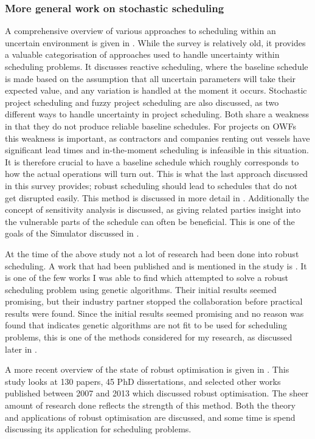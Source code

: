 \documentclass[a4paper,12pt]{article}
\begin{document}

\subsubsection{More general work on stochastic scheduling} \label{sss:stoch}
A comprehensive overview of various approaches to scheduling within an uncertain environment is given in \cite{herroelen2005project}. While the survey is relatively old, it provides a valuable categorisation of approaches used to handle uncertainty within scheduling problems. It discusses reactive scheduling, where the baseline schedule is made based on the assumption that all uncertain parameters will take their expected value, and any variation is handled at the moment it occurs. Stochastic project scheduling and fuzzy project scheduling are also discussed, as two different ways to handle uncertainty in project scheduling. Both share a weakness in that they do not produce reliable baseline schedules. For projects on OWFs this weakness is important, as contractors and companies renting out vessels have significant lead times and in-the-moment scheduling is infeasible in this situation. It is therefore crucial to have a baseline schedule which roughly corresponds to how the actual operations will turn out. This is what the last approach discussed in this survey provides; robust scheduling should lead to schedules that do not get disrupted easily. This method is discussed in more detail in . Additionally the concept of sensitivity analysis is discussed, as giving related parties insight into the vulnerable parts of the schedule can often be beneficial. This is one of the goals of the Simulator discussed in . 

At the time of the above study not a lot of research had been done into robust scheduling. A work that had been published and is mentioned in the study is \cite{sevaux2002genetic}. It is one of the few works I was able to find which attempted to solve a robust scheduling problem using genetic algorithms. Their initial results seemed promising, but their industry partner stopped the collaboration before practical results were found. Since the initial results seemed promising and no reason was found that indicates genetic algorithms are not fit to be used for scheduling problems, this is one of the methods considered for my research, as discussed later in .

\bigskip

A more recent overview of the state of robust optimisation is given in \cite{gabrel2014recent}. This study looks at 130 papers, 45 PhD dissertations, and selected other works published between 2007 and 2013 which discussed robust optimisation. The sheer amount of research done reflects the strength of this method. Both the theory and applications of robust optimisation are discussed, and some time is spend discussing its application for scheduling problems. 
\end{document}
